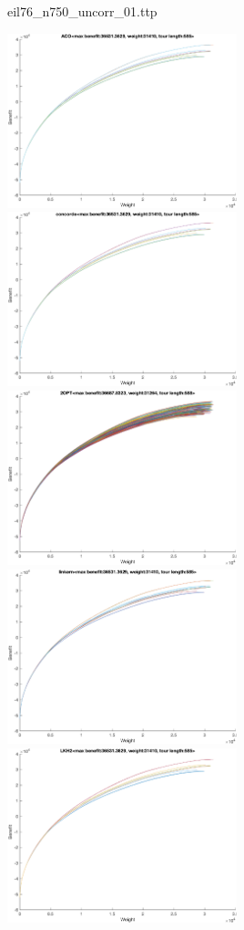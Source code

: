 \documentclass{article}
\begin{document}
\newpage
eil76\_n750\_uncorr\_01.ttp

\noindent
\includegraphics[width=0.5\textwidth]{eil76figs/eil76_n750_uncorr_01.ttp.aco.txt.eps}
\includegraphics[width=0.5\textwidth]{eil76figs/eil76_n750_uncorr_01.ttp.con.txt.eps}
\includegraphics[width=0.5\textwidth]{eil76figs/eil76_n750_uncorr_01.ttp.inv.txt.eps}
\includegraphics[width=0.5\textwidth]{eil76figs/eil76_n750_uncorr_01.ttp.lkh.txt.eps}
\includegraphics[width=0.5\textwidth]{eil76figs/eil76_n750_uncorr_01.ttp.lkh2.txt.eps}
\end{document}
